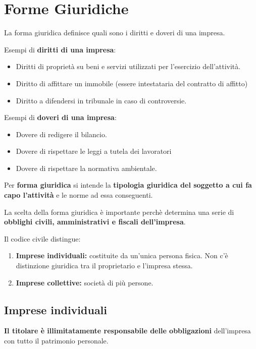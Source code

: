 \documentclass[../main.tex]{subfiles}
\begin{document}
\section{Forme Giuridiche}

La forma giuridica definisce quali sono i diritti e doveri di una impresa.

Esempi di \textbf{diritti di una impresa}:
\begin{itemize}
\item
Diritti di proprietà su beni e servizi utilizzati per l'esercizio dell'attività.
\item Diritto di affittare un immobile (essere intestataria del contratto di affitto)
\item Diritto a difendersi in tribunale in caso di controversie.
\end{itemize}

Esempi di \textbf{doveri di una impresa}:
\begin{itemize}
\item Dovere di redigere il bilancio.
\item Dovere di rispettare le leggi a tutela dei lavoratori
\item Dovere di rispettare la normativa ambientale.
\end{itemize}

Per \textbf{forma giuridica} si intende la \textbf{tipologia giuridica del soggetto a cui fa capo l'attività} e le norme ad essa conseguenti.

La scelta della forma giuridica è importante perchè determina una serie di \textbf{obblighi civili, amministrativi e fiscali dell'impresa}.

Il codice civile distingue:

\begin{enumerate}
\item \textbf{Imprese individuali:} costituite  da un'unica persona fisica. Non c'è distinzione giuridica tra il proprietario e l'impresa stessa.

\item \textbf{Imprese collettive:} società di più persone.
\end{enumerate}

\subsection{Imprese individuali}

\textbf{Il titolare è illimitatamente responsabile delle obbligazioni} dell'impresa con tutto il patrimonio personale.
\end{document}
